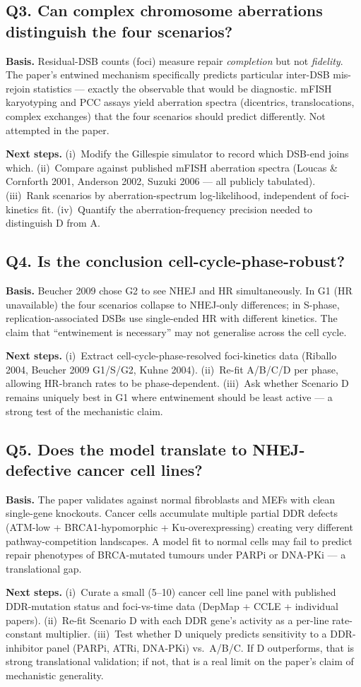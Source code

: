 \subsection*{Q3. Can complex chromosome aberrations distinguish the four scenarios?}
\textbf{Basis.} Residual-DSB counts (foci) measure repair
\emph{completion} but not \emph{fidelity}. The paper's entwined
mechanism specifically predicts particular inter-DSB mis-rejoin
statistics --- exactly the observable that would be diagnostic.
mFISH karyotyping and PCC assays yield aberration spectra
(dicentrics, translocations, complex exchanges) that the four
scenarios should predict differently. Not attempted in the paper.

\textbf{Next steps.} (i)~Modify the Gillespie simulator to record
which DSB-end joins which. (ii)~Compare against published mFISH
aberration spectra (Loucas \& Cornforth 2001, Anderson 2002,
Suzuki 2006 --- all publicly tabulated). (iii)~Rank scenarios by
aberration-spectrum log-likelihood, independent of foci-kinetics
fit. (iv)~Quantify the aberration-frequency precision needed to
distinguish D from A.

\subsection*{Q4. Is the conclusion cell-cycle-phase-robust?}
\textbf{Basis.} Beucher 2009 chose G2 to see NHEJ and HR
simultaneously. In G1 (HR unavailable) the four scenarios collapse
to NHEJ-only differences; in S-phase, replication-associated DSBs
use single-ended HR with different kinetics. The claim that
``entwinement is necessary'' may not generalise across the cell
cycle.

\textbf{Next steps.} (i)~Extract cell-cycle-phase-resolved
foci-kinetics data (Riballo 2004, Beucher 2009 G1/S/G2, Kuhne 2004).
(ii)~Re-fit A/B/C/D per phase, allowing HR-branch rates to be
phase-dependent. (iii)~Ask whether Scenario D remains uniquely
best in G1 where entwinement should be least active --- a strong
test of the mechanistic claim.

\subsection*{Q5. Does the model translate to NHEJ-defective cancer cell lines?}
\textbf{Basis.} The paper validates against normal fibroblasts and
MEFs with clean single-gene knockouts. Cancer cells accumulate
multiple partial DDR defects (ATM-low + BRCA1-hypomorphic +
Ku-overexpressing) creating very different pathway-competition
landscapes. A model fit to normal cells may fail to predict repair
phenotypes of BRCA-mutated tumours under PARPi or DNA-PKi --- a
translational gap.

\textbf{Next steps.} (i)~Curate a small (5--10) cancer cell line
panel with published DDR-mutation status and foci-vs-time data
(DepMap + CCLE + individual papers). (ii)~Re-fit Scenario D with
each DDR gene's activity as a per-line rate-constant multiplier.
(iii)~Test whether D uniquely predicts sensitivity to a DDR-inhibitor
panel (PARPi, ATRi, DNA-PKi) vs.\ A/B/C. If D outperforms, that is
strong translational validation; if not, that is a real limit on
the paper's claim of mechanistic generality.

